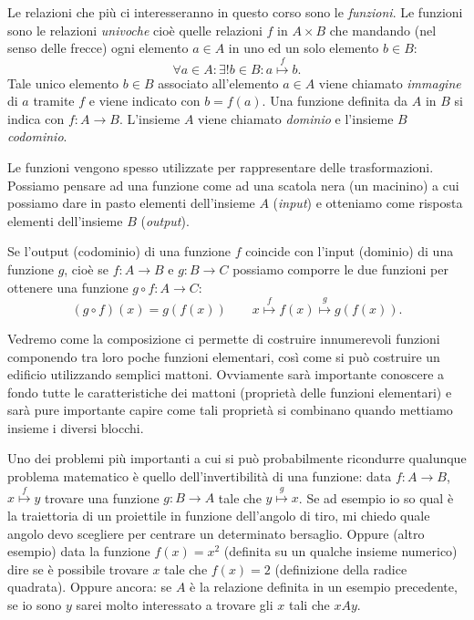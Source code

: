 \documentclass[italian,a4paper,hidelinks]{scrartcl}
\newcommand{\myemph}[1]{\emph{#1}\marginpar{#1}}
\begin{document}
Le relazioni che più ci interesseranno in questo corso sono le \myemph{funzioni}.
Le funzioni sono le relazioni \emph{univoche} cioè quelle relazioni $f$ in
$A\times B$ che
mandando (nel senso delle frecce) ogni elemento $a\in A$ in uno
ed un solo elemento
$b\in B$:
\[
\forall a\in A\colon \exists ! b\in B\colon a\stackrel{f}\mapsto b.
\]
Tale unico elemento $b\in B$ associato all'elemento $a\in A$ viene chiamato
\emph{immagine} di $a$ tramite $f$ e viene indicato con $b=f(a)$.
Una funzione definita da $A$ in $B$ si indica con $f\colon A \to B$. L'insieme
$A$ viene chiamato \myemph{dominio} e l'insieme $B$ \myemph{codominio}.

Le funzioni vengono spesso utilizzate per rappresentare delle trasformazioni.
Possiamo pensare ad una funzione come ad una scatola nera (un macinino)
a cui possiamo dare in pasto elementi dell'insieme $A$ (\emph{input})
e otteniamo come risposta elementi dell'insieme $B$ (\emph{output}).

Se l'output (codominio) di una funzione $f$
coincide con l'input (dominio) di una funzione $g$,
cioè se $f\colon A \to B$ e $g\colon B \to C$
possiamo comporre
le due funzioni per ottenere una funzione
$g\circ f \colon A \to C$:
\[
(g\circ f)(x) = g(f(x))\qquad
x \stackrel f \mapsto f(x) \stackrel g \mapsto g(f(x)).
\]

Vedremo come la composizione ci permette di costruire innumerevoli funzioni
componendo tra loro poche funzioni elementari, così come si può costruire un edificio
utilizzando semplici mattoni.
Ovviamente sarà importante conoscere a fondo
tutte le caratteristiche dei mattoni (proprietà delle funzioni elementari)
e sarà pure importante capire come tali proprietà si combinano quando mettiamo
insieme i diversi blocchi.

Uno dei problemi più importanti a
cui si può probabilmente ricondurre qualunque problema
matematico è quello dell'invertibilità di una funzione: data $f\colon A\to B$,
$x\stackrel f \mapsto y$ trovare una funzione $g\colon B\to A$ tale che
$y \stackrel g\mapsto x$. Se ad esempio io so qual è la traiettoria di
un proiettile in funzione dell'angolo di tiro, mi chiedo quale angolo devo
scegliere per centrare un determinato bersaglio.
Oppure (altro esempio) data la funzione $f(x) = x^2$ (definita su un qualche insieme
numerico) dire se è possibile trovare $x$ tale che $f(x) = 2$
(definizione della radice quadrata).
Oppure ancora: se $A$ è la relazione definita in un esempio precedente,
se io sono $y$ sarei molto interessato a trovare gli $x$ tali che $x A y$.
\end{document}
